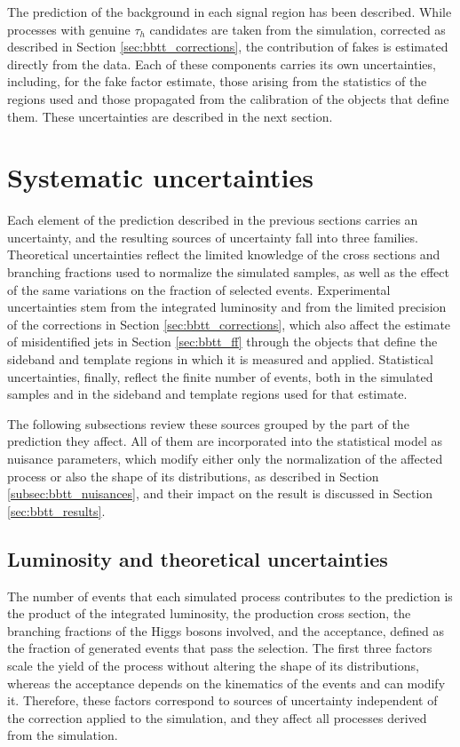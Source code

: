 \bigskip


The prediction of the background in each signal region has been described. While processes with genuine $\tau_h$ candidates are taken from the simulation, corrected as described in Section \ref{sec:bbtt_corrections}, the contribution of fakes is estimated directly from the data. Each of these components carries its own uncertainties, including, for the fake factor estimate, those arising from the statistics of the regions used and those propagated from the calibration of the objects that define them. These uncertainties are described in the next section.



\section{Systematic uncertainties}
\label{sec:bbtt_systematics}
%
Each element of the prediction described in the previous sections carries an uncertainty, and the resulting sources of uncertainty fall into three families. Theoretical uncertainties reflect the limited knowledge of the cross sections and branching fractions used to normalize the simulated samples, as well as the effect of the same variations on the fraction of selected events. Experimental uncertainties stem from the integrated luminosity and from the limited precision of the corrections in Section \ref{sec:bbtt_corrections}, which also affect the estimate of misidentified jets in Section \ref{sec:bbtt_ff} through the objects that define the sideband and template regions in which it is measured and applied. Statistical uncertainties, finally, reflect the finite number of events, both in the simulated samples and in the sideband and template regions used for that estimate.

The following subsections review these sources grouped by the part of the prediction they affect. All of them are incorporated into the statistical model as nuisance parameters, which modify either only the normalization of the affected process or also the shape of its distributions, as described in Section \ref{subsec:bbtt_nuisances}, and their impact on the result is discussed in Section \ref{sec:bbtt_results}.

\subsection{Luminosity and theoretical uncertainties}
%
The number of events that each simulated process contributes to the prediction is the product of the integrated luminosity, the production cross section, the branching fractions of the Higgs bosons involved, and the acceptance, defined as the fraction of generated events that pass the selection. The first three factors scale the yield of the process without altering the shape of its distributions, whereas the acceptance depends on the kinematics of the events and can modify it. Therefore, these factors correspond to sources of uncertainty independent of the correction applied to the simulation, and they affect all processes derived from the simulation.

